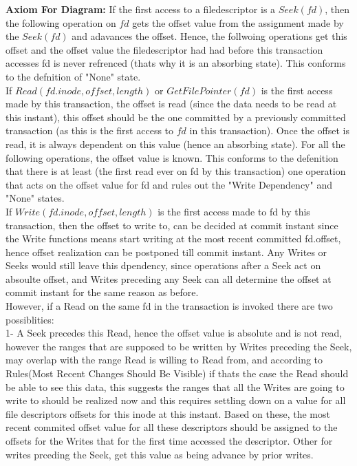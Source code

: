 \documentclass[a4paper, 11pt]{article}
\begin{document}
\textbf{Axiom For Diagram:} If the first access to a filedescriptor is a $Seek(fd)$, then the following operation on $fd$ gets the offset value from the assignment made by the $Seek(fd)$ and adavances the offset. Hence, the follwoing operations get this offset and the offset value the filedescriptor had had before this transaction accesses fd is never refrenced (thats why it is an absorbing state). This conforms to the defnition of "None" state.\\ 

If $Read(fd.inode, offset, length)$ or $GetFilePointer(fd)$ is the first access made by this transaction, the offset is read (since the data needs to be read at this instant), this offset should be the one committed by a previously committed transaction (as this is the first access to $fd$ in this transaction). Once the offset is read, it is always dependent on this value (hence an absorbing state). For all the following operations, the offset value is known. This conforms to the defenition that there is at least (the first read ever on fd by this transaction) one operation that acts on the offset value for fd and rules out the "Write Dependency" and "None" states.\\

If $Write(fd.inode, offset, length)$ is the first access made to fd by this transaction, then the offset to write to, can be decided at commit instant since the Write functions means start writing at the most recent committed fd.offset, hence offset realization can be postponed till commit instant. Any Writes or Seeks would still leave this dpendency, since operations after a Seek act on absoulte offset, and Writes preceding any Seek can all determine the offset at commit instant for the same reason as before.\\    

However, if a Read on the same fd in the transaction is invoked there are two possiblities:\\

1- A Seek precedes this Read, hence the offset value is absolute and is not read, however the ranges that are supposed to be written by Writes preceding the Seek, may overlap with the range Read is willing to Read from, and according to Rules(Most Recent Changes Should Be Visible) if thats the case the Read should be able to see this data, this suggests the ranges that all the Writes are going to write to should be realized now and this requires settling down on a value for all file descriptors offsets for this inode at this instant. Based on these, the most recent commited offset value for all these descriptors should be assigned to the offsets for the Writes that for the first time accessed the descriptor. Other for writes prceding the Seek, get this value as being advance by prior writes.\\
\end{document}
